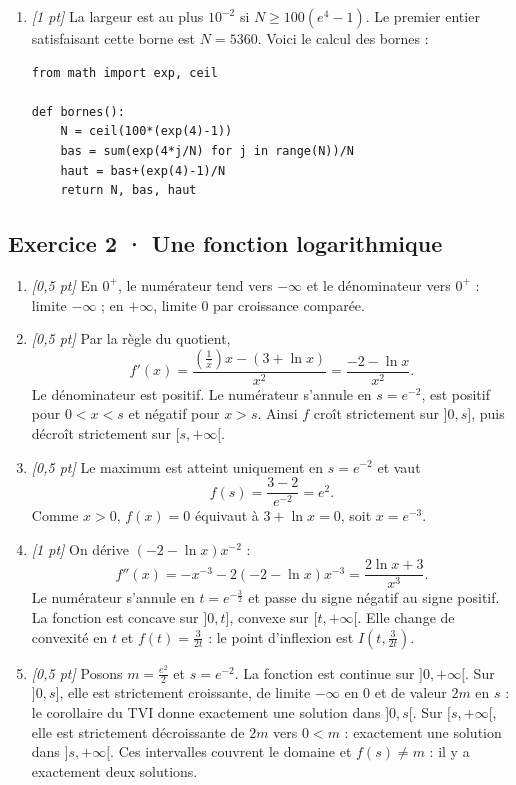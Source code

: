 \begin{enumerate}

\item \textit{[1 pt]} La largeur est au plus $10^{-2}$ si $N\ge100(e^{4}-1)$. Le premier entier satisfaisant cette borne est $N=5360$. Voici le calcul des bornes :
\begin{lstlisting}
from math import exp, ceil

def bornes():
    N = ceil(100*(exp(4)-1))
    bas = sum(exp(4*j/N) for j in range(N))/N
    haut = bas+(exp(4)-1)/N
    return N, bas, haut
\end{lstlisting}


\end{enumerate}

\subsection*{Exercice 2 · Une fonction logarithmique}\begin{enumerate}

\item \textit{[0,5 pt]} En $0^+$, le numérateur tend vers $-\infty$ et le dénominateur vers $0^+$ : limite $-\infty$ ; en $+\infty$, limite $0$ par croissance comparée.

\item \textit{[0,5 pt]} Par la règle du quotient,
\[f'(x)=\frac{(\frac{1}{x})x-(3+\ln x)}{x^2}=\frac{-2-\ln x}{x^2}.\]
Le dénominateur est positif. Le numérateur s'annule en $s=e^{-2}$, est positif pour $0<x<s$ et négatif pour $x>s$. Ainsi $f$ croît strictement sur $]0,s]$, puis décroît strictement sur $[s,+\infty[$.

\item \textit{[0,5 pt]} Le maximum est atteint uniquement en $s=e^{-2}$ et vaut
\[f(s)=\frac{3- 2}{e^{-2}}=e^{2}.\]
Comme $x>0$, $f(x)=0$ équivaut à $3+\ln x=0$, soit $x=e^{-3}$.

\item \textit{[1 pt]} On dérive $(-2-\ln x)x^{-2}$ :
\[f''(x)=-x^{-3}-2(-2-\ln x)x^{-3}=\frac{2\ln x+3}{x^3}.\]
Le numérateur s'annule en $t=e^{-\frac{3}{2}}$ et passe du signe négatif au signe positif. La fonction est concave sur $]0,t]$, convexe sur $[t,+\infty[$. Elle change de convexité en $t$ et $f(t)=\frac{3}{2t}$ : le point d'inflexion est $I(t,\frac{3}{2t})$.

\item \textit{[0,5 pt]} Posons $m=\frac{e^{2}}{2}$ et $s=e^{-2}$. La fonction est continue sur $]0,+\infty[$. Sur $]0,s]$, elle est strictement croissante, de limite $-\infty$ en $0$ et de valeur $2m$ en $s$ : le corollaire du TVI donne exactement une solution dans $]0,s[$. Sur $[s,+\infty[$, elle est strictement décroissante de $2m$ vers $0<m$ : exactement une solution dans $]s,+\infty[$. Ces intervalles couvrent le domaine et $f(s)\ne m$ : il y a exactement deux solutions.


\end{enumerate}
